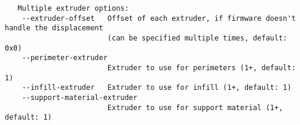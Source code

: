 \begin{verbatim}
   Multiple extruder options:
    --extruder-offset   Offset of each extruder, if firmware doesn't handle the displacement
                        (can be specified multiple times, default: 0x0)
    --perimeter-extruder
                        Extruder to use for perimeters (1+, default: 1)
    --infill-extruder   Extruder to use for infill (1+, default: 1)
    --support-material-extruder
                        Extruder to use for support material (1+, default: 1)
\end{verbatim}
\normalsize

